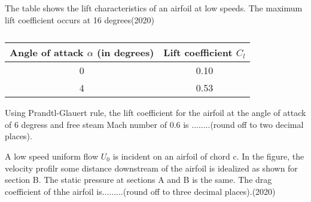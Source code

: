     \item The table shows the lift characteristics of an airfoil at low speeds. The maximum lift coefficient occurs at 16 degrees\hfill (2020)
    \newpage
    \begin{table}
        \centering
        \begin{tabular}{|c|c|}
            \hline
            Angle of attack $\alpha$ (in degrees) & Lift coefficient $C_l$ \\ \hline
            0 & 0.10 \\ \hline
            4 & 0.53 \\ \hline
        \end{tabular} %
        \caption{}
    \end{table}
    Using Prandtl-Glauert rule, the lift coefficient for the airfoil at the angle of attack of 6 degress and free steam Mach number of 0.6 is ........(round off to two decimal places).
    \item A low speed uniform flow $U_0$ is incident on an airfoil of chord c. In the figure, the velocity profilr some distance downstream of the airfoil is idealized as shown for section B. The static pressure at sections A and B is the same. The drag coefficient of thhe airfoil is.........(round off to three decimal places).\hfill (2020)
